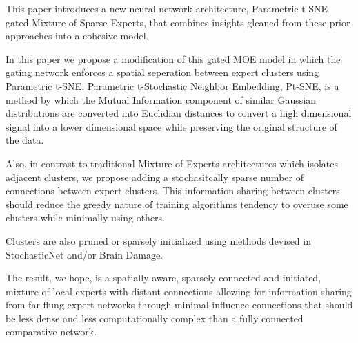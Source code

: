 \documentclass{llncs}
\begin{document}
This paper introduces a new neural network architecture, Parametric t-SNE gated Mixture of Sparse Experts, that combines insights gleaned from these prior approaches into a cohesive model.

In this paper we propose a modification of this gated MOE model in which the gating network enforces a spatial seperation between expert clusters using Parametric t-SNE. Parametric t-Stochastic Neighbor Embedding, Pt-SNE, is a method by which the Mutual Information component of similar Gaussian distributions are converted into Euclidian distances to convert a high dimensional signal into a lower dimensional space while preserving the original structure of the data.

Also, in contrast to traditional Mixture of Experts architectures which isolates adjacent clusters, we propose adding a stochasitcally sparse number of connections between expert clusters. This information sharing between clusters should reduce the greedy nature of training algorithms tendency to overuse some clusters while minimally using others.

Clusters are also pruned or sparsely initialized using methods devised in StochasticNet and/or Brain Damage.

The result, we hope, is a spatially aware, sparsely connected and initiated, mixture of local experts with distant connections allowing for information sharing from far flung expert networks through minimal influence connections that should be less dense and less computationally complex than a fully connected comparative network.~\cite{Caswell:2016aa,Krizhevsky:2011aa,Sporns:2004aa,Kiyono:2019aa,Hassibi:1993aa,LeCun:1990aa,Zorins:2015aa,Samsonovich:2005aa,Morris:2003aa,Watts:1998aa,Han:2015aa,Huang:2017aa,Srivastava:2014aa,Zhigulin:2004aa,Hinton:2012aa,Mocanu:2018aa,Wan:2013aa,Shazeer:2017aa,Jacobs_1991,Cayco-Gajic:2017aa,SPORNS_2004,DBLP:journals/corr/FernandoBBZHRPW17,NIPS2015_5784,Bassett:2006aa,cite-key}


%
%
 
 

\end{document}
